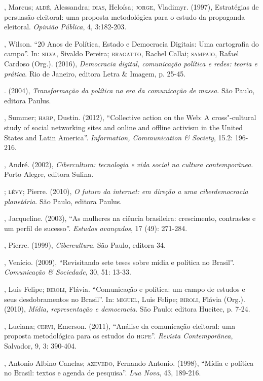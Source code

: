 \begin{bibliohedra}
, Marcus; \textsc{aldé}, Alessandra; \textsc{dias}, Heloísa; \textsc{jorge}, Vladimyr.
(1997), Estratégias de persuasão eleitoral: uma proposta metodológica
para o estudo da propaganda eleitoral. \emph{Opinião Pública}, 4,
3:182-203.

, Wilson. ``20 Anos de Política, Estado e Democracia Digitais: Uma
cartografia do campo''. In: \textsc{silva}, Sivaldo Pereira; \textsc{bragatto}, Rachel
Callai; \textsc{sampaio}, Rafael Cardoso (Org.). (2016), \emph{Democracia
digital, comunicação política e redes: teoria e prática}. Rio
de Janeiro, editora Letra \& Imagem, p. 25-45.

\titidem. (2004), \emph{Transformação da política na era da
comunicação de massa}. São Paulo, editora Paulus.

, Summer; \textsc{harp}, Dustin. (2012), ``Collective action on the Web: A
cross"-cultural study of social networking sites and online and offline
activism in the United States and Latin America''. \emph{Information,
Communication \& Society}, 15.2: 196-216.

, André. (2002), \emph{Cibercultura: tecnologia e vida social na
cultura contemporânea}. Porto Alegre, editora Sulina.

\titidem; \textsc{lévy}; Pierre. (2010), \emph{O futuro da internet: em
direção a uma ciberdemocracia planetária}. São Paulo, editora Paulus.

, Jacqueline. (2003), ``As mulheres na ciência brasileira:
crescimento, contrastes e um perfil de sucesso''. \emph{Estudos
avançados}, 17 (49): 271-284.

, Pierre. (1999), \emph{Cibercultura}. São Paulo, editora 34.

, Venício. (2009), ``Revisitando sete teses sobre mídia e política
no Brasil''. \emph{Comunicação \& Sociedade}, 30, 51: 13-33.

, Luis Felipe; \textsc{biroli}, Flávia. ``Comunicação e política: um campo
de estudos e seus desdobramentos no Brasil''. In: \textsc{miguel}, Luis Felipe;
\textsc{biroli}, Flávia (Org.). (2010), \emph{Mídia, representação e democracia}.
São Paulo: editora Hucitec, p. 7-24.

, Luciana; \textsc{cervi}, Emerson. (2011), ``Análise da comunicação
eleitoral: uma proposta metodológica para os estudos do \textsc{hgpe}''.
\emph{Revista Contemporânea}, Salvador, 9, 3: 390-404.

, Antonio Albino Canelas; \textsc{azevedo}, Fernando Antonio. (1998),
``Mídia e política no Brasil: textos e agenda de pesquisa''. \emph{Lua
Nova}, 43, 189-216.


\end{bibliohedra}
